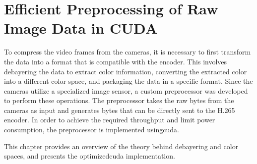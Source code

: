 \chapter{Efficient Preprocessing of Raw Image Data in CUDA}
\label{chap:debayer}

To compress the video frames from the cameras, it is necessary to first transform the data into a format that is compatible with the encoder.
This involves debayering the data to extract color information, converting the extracted color into a different color space, and packaging the data in a specific format.
Since the cameras utilize a specialized image sensor, a custom preprocessor was developed to perform these operations.
The preprocessor takes the raw bytes from the cameras as input and generates bytes that can be directly sent to the H.265 encoder.
In order to achieve the required throughput and limit power consumption, the preprocessor is implemented using\gls{cuda}.

This chapter provides an overview of the theory behind debayering and color spaces, and presents the optimized\gls{cuda} implementation.

